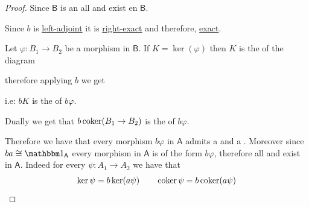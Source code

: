 \documentclass[../main.tex]{subfiles}
\begin{document}
\begin{proof}
  Since \(\mathsf{B}\) is an  all  and  exist en \(\mathsf{B}\).

  Since \(b\) is \hyperref[def:adjunction]{left-adjoint} it is \hyperref[def:exact-functor]{right-exact} and therefore, \hyperref[def:exact-functor]{exact}.

  Let \(\varphi: B_{1} \to B_{2}\) be a morphism in \(\mathsf{B}\).
  If \(K = \ker(\varphi)\) then \(K\) is the  of the diagram
  \begin{center}
  \end{center}
  therefore applying \(b\) we get
  \begin{center}
  \end{center}
  i.e: \(bK\) is the  of \(b\varphi\).

  Dually we get that \(b\operatorname*{coker}(B_{1} \to B_{2})\) is the  of \(b\varphi\).

  Therefore we have that every morphism \(b\varphi\) in \(\mathsf{A}\) admits a  and a .
  Moreover since \(ba \cong \id_{\mathsf{A}}\) every morphism in \(\mathsf{A}\) is of the form \(b\varphi\), therefore all  and  exist in \(\mathsf{A}\).
  Indeed for every \(\psi: A_{1} \to A_{2}\) we have that
  \begin{align} \label{eq:ker-coker-lemma}
    \ker \psi = b\ker(a\psi) \qquad \operatorname*{coker} \psi = b\operatorname*{coker}(a\psi)
  \end{align}


\end{proof}
\end{document}
